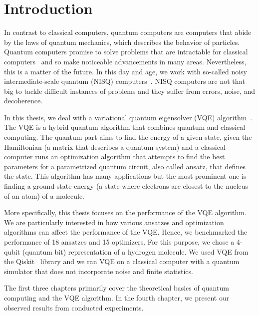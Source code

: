 \chapter*{Introduction}

In contrast to classical computers, quantum computers are computers that abide by the laws of quantum mechanics, which describes the behavior of particles. Quantum computers promise to solve problems that are intractable for classical computers~\cite{peruzzo} and so make noticeable advancements in many areas. Nevertheless, this is a matter of the future. In this day and age, we work with so-called noisy intermediate-scale quantum (NISQ) computers~\cite{nisq}. NISQ computers are not that big to tackle difficult instances of problems and they suffer from errors, noise, and decoherence.

In this thesis, we deal with a variational quantum eigensolver (VQE) algorithm~\cite{peruzzo,vqe_method}. The VQE is a hybrid quantum algorithm that combines quantum and classical computing. The quantum part aims to find the energy of a given state, given the Hamiltonian (a matrix that describes a quantum system) and a classical computer runs an optimization algorithm that attempts to find the best parameters for a parametrized quantum circuit, also called ansatz, that defines the state. This algorithm has many applications but the most prominent one is finding a ground state energy (a state where electrons are closest to the nucleus of an atom) of a molecule.

More specifically, this thesis focuses on the performance of the VQE algorithm. We are particularly interested in how various ansatzes and optimization algorithms can affect the performance of the VQE. Hence, we benchmarked the performance of 18 ansatzes and 15 optimizers. For this purpose, we chose a 4-qubit (quantum bit) representation of a hydrogen molecule. We used VQE from the Qiskit~\cite{qiskit} library and we ran VQE on a classical computer with a quantum simulator that does not incorporate noise and finite statistics.

The first three chapters primarily cover the theoretical basics of quantum computing and the VQE algorithm. In the fourth chapter, we present our observed results from conducted experiments.